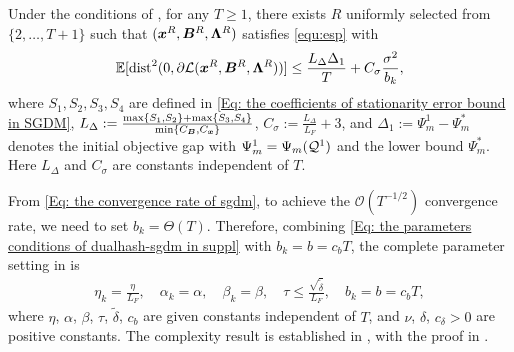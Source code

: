 \begin{lemma}
    \label{lemma: convergence rate sgdm} Under the conditions of , for any $T \geq 1$, there exists
    $R$ uniformly selected from $\{2,\ldots,T+1\}$ such that $(\bm{x}^{R}, \bm{B}
    ^{R}, \bm{\Lambda}^{R})$ satisfies \eqref{equ:esp} with
    \begin{align}
        \label{Eq: the convergence rate of sgdm}\mathbb{E}[\mathrm{dist}^{2}(0, \partial \mathcal{L}(\bm{x}^{R}, \bm{B}^{R}, \bm{\Lambda}^{R}))] \leq \frac{L_{\Delta}\Delta_{1}}{T}+ C_{\sigma}\frac{\sigma^{2}}{b_{k}},
    \end{align}where $S_1, S_2, S_3, S_4$ are defined in 
    \eqref{Eq: the coefficients of stationarity error bound in SGDM},
    $L_{\Delta} := \frac{\max\{S_{1}, S_{2}\} + 
    \max\{S_{3}, S_{4}\}}{\min\{C_{\bm{B}}, C_{\bm{x}}\}}$, 
    $C_{\sigma} := \frac{L_{\Delta}}{L_{F}} + 3$, and $\Delta_{1} := \Psi_m^1 - \Psi_m^{*}$ denotes the initial objective gap with $\Psi_m^{1}= \Psi_m(\mathcal{Q}^{1})$ and the lower bound $\Psi_m^{*}$. Here $L_{\Delta}$ and 
    $C_{\sigma}$ are constants independent of $T$.
\end{lemma}
From \eqref{Eq: the convergence rate of sgdm}, to achieve the $\mathcal{O}(T^{-1/2})$ 
convergence rate, we need to set $b_k = \Theta(T)$. Therefore, combining 
\eqref{Eq: the parameters conditions of dualhash-sgdm in suppl} with $b_k = b = c_b T$, the complete parameter setting in  is 
\begin{align}
\label{Eq: the parameters conditions of dualhash-sgdm}
    \eta_k = \frac{\eta}{L_F}, \quad \alpha_k = \alpha, \quad \beta_k = \beta, \quad 
    \tau \leq \frac{\sqrt{\tilde{\delta}}}{L_F}, \quad b_k = b = c_b T,
\end{align}
where $\eta$, $\alpha$, $\beta$, $\tau$, $\tilde{\delta}$, $c_b$ are given constants 
independent of $T$, and $\nu$, $\delta$, $c_{\delta} > 0$ are positive constants. The complexity result is established in , with the proof in  .

